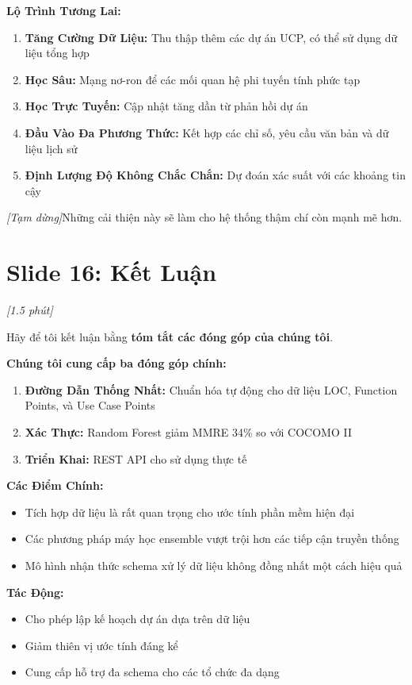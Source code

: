 \documentclass[12pt,a4paper]{article}
\newcommand{\slide}[1]{\section*{\textcolor{slidenum}{Slide #1}}}
\newcommand{\timing}[1]{\textcolor{timing}{\textit{[#1]}}}
\newcommand{\keypoint}[1]{\textcolor{keypoint}{\textbf{#1}}}
\newcommand{\pause}{\textit{[Tạm dừng]}}
\begin{document}
\textbf{Lộ Trình Tương Lai:}
\begin{enumerate}
    \item \textbf{Tăng Cường Dữ Liệu:} Thu thập thêm các dự án UCP, có thể sử dụng dữ liệu tổng hợp
    \item \textbf{Học Sâu:} Mạng nơ-ron để các mối quan hệ phi tuyến tính phức tạp
    \item \textbf{Học Trực Tuyến:} Cập nhật tăng dần từ phản hồi dự án
    \item \textbf{Đầu Vào Đa Phương Thức:} Kết hợp các chỉ số, yêu cầu văn bản và dữ liệu lịch sử
    \item \textbf{Định Lượng Độ Không Chắc Chắn:} Dự đoán xác suất với các khoảng tin cậy
\end{enumerate}

\pause Những cải thiện này sẽ làm cho hệ thống thậm chí còn mạnh mẽ hơn.

\slide{16: Kết Luận}
\timing{1.5 phút}

Hãy để tôi kết luận bằng \keypoint{tóm tắt các đóng góp của chúng tôi}.

\textbf{Chúng tôi cung cấp ba đóng góp chính:}
\begin{enumerate}
    \item \textbf{Đường Dẫn Thống Nhất:} Chuẩn hóa tự động cho dữ liệu LOC, Function Points, và Use Case Points
    \item \textbf{Xác Thực:} Random Forest giảm MMRE 34\% so với COCOMO II
    \item \textbf{Triển Khai:} REST API cho sử dụng thực tế
\end{enumerate}

\textbf{Các Điểm Chính:}
\begin{itemize}
    \item Tích hợp dữ liệu là rất quan trọng cho ước tính phần mềm hiện đại
    \item Các phương pháp máy học ensemble vượt trội hơn các tiếp cận truyền thống
    \item Mô hình nhận thức schema xử lý dữ liệu không đồng nhất một cách hiệu quả
\end{itemize}

\textbf{Tác Động:}
\begin{itemize}
    \item Cho phép lập kế hoạch dự án dựa trên dữ liệu
    \item Giảm thiên vị ước tính đáng kể
    \item Cung cấp hỗ trợ đa schema cho các tổ chức đa dạng
\end{itemize}
\end{document}
